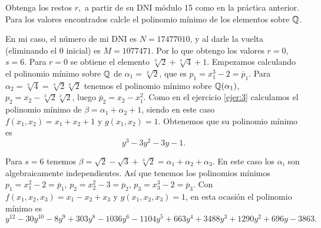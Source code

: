 \documentclass[twoside]{article}
\begin{document}
\begin{ejercicio}{4}
Obtenga los restos $r,$ a partir de su DNI módulo 15 como en la práctica anterior. Para los valores encontrados calcle el polinomio mínimo de los elementos sobre $\mathbb{Q}$. 
\end{ejercicio}
\begin{solucion}
En mi caso, el número de mi DNI es $N=17477010$, y al darle la vuelta (eliminando el 0 inicial) es $M=1077471$. Por lo que obtengo los valores $r=0$, $s=6$. 
Para $r=0$ se obtiene el elemento $\sqrt[3]{2}+\sqrt[3]{4}+1$. Empezamos calculando el polinomio mínimo sobre $\mathbb{Q}$ de $\alpha_1=\sqrt[3]{2}$, que es $p_1=x_1^3-2=\overline{p}_1$. Para $\alpha_2=\sqrt[3]{4}=\sqrt[3]{2}\sqrt[3]{2}$ tenemos el polinomio mínimo sobre $\mathbb{Q}(\alpha_1)$, $p_2=x_2-\sqrt[3]{2}\sqrt[3]{2}$, luego $\overline{p}_2=x_2-x_1^2$. Como en el ejercicio \ref{ejer:3} calculamos el polinomio mínimo de $\beta=\alpha_1+\alpha_2+1$, siendo en este caso $f(x_1,x_2)=x_1+x_2+1$ y $g(x_1,x_2)=1$. Obtenemos que su polinomio mínimo es $$y^3 - 3y^2 - 3y - 1.$$

Para $s=6$ tenemos $\beta=\sqrt{2}-\sqrt{3}+\sqrt[3]{2}=\alpha_1+\alpha_2+\alpha_3$. En este caso los $\alpha_i$ son algebraicamente independientes. Así que tenemos los polinomios mínimos $p_1=x_1^2-2=\overline{p}_1$, $p_2=x_2^2-3=\overline{p}_2$, $p_3=x_3^3-2=\overline{p}_3$. Con $f(x_1,x_2,x_3)=x_1-x_2+x_3$ y $g(x_1,x_2,x_3)=1$, en esta ocasión el polinomio mínimo es
\[
y^12 - 30y^10 - 8y^9 + 303y^8 - 1036y^6 - 1104y^5 + 663y^4 + 3488y^3 + 1290y^2 + 696y - 3863.
\]
\end{solucion}
\end{document}
